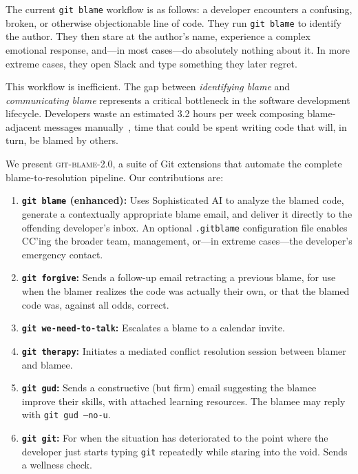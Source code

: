 \documentclass{sigtbd}
\begin{document}
The current \texttt{git blame} workflow is as follows: a developer encounters a confusing, broken, or otherwise objectionable line of code. They run \texttt{git blame} to identify the author. They then stare at the author's name, experience a complex emotional response, and---in most cases---do absolutely nothing about it. In more extreme cases, they open Slack and type something they later regret.

This workflow is inefficient. The gap between \emph{identifying blame} and \emph{communicating blame} represents a critical bottleneck in the software development lifecycle. Developers waste an estimated 3.2 hours per week composing blame-adjacent messages manually~\cite{Fabricated:2024}, time that could be spent writing code that will, in turn, be blamed by others.

We present \textsc{git-blame-2.0}, a suite of Git extensions that automate the complete blame-to-resolution pipeline. Our contributions are:

\begin{enumerate}[leftmargin=*]
  \item \textbf{\texttt{git blame} (enhanced):} Uses Sophisticated AI\texttrademark{} to analyze the blamed code, generate a contextually appropriate blame email, and deliver it directly to the offending developer's inbox. An optional \texttt{.gitblame} configuration file enables CC'ing the broader team, management, or---in extreme cases---the developer's emergency contact.
  \item \textbf{\texttt{git forgive}:} Sends a follow-up email retracting a previous blame, for use when the blamer realizes the code was actually their own, or that the blamed code was, against all odds, correct.
  \item \textbf{\texttt{git we-need-to-talk}:} Escalates a blame to a calendar invite.
  \item \textbf{\texttt{git therapy}:} Initiates a mediated conflict resolution session between blamer and blamee.
  \item \textbf{\texttt{git gud}:} Sends a constructive (but firm) email suggesting the blamee improve their skills, with attached learning resources. The blamee may reply with \texttt{git gud --no-u}.
  \item \textbf{\texttt{git git}:} For when the situation has deteriorated to the point where the developer just starts typing \texttt{git} repeatedly while staring into the void. Sends a wellness check.
\end{enumerate}
\end{document}
